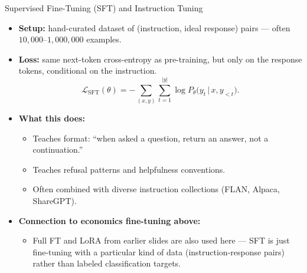 \begin{frame}{Supervised Fine-Tuning (SFT) and Instruction Tuning}
\begin{itemize}
\item \textbf{Setup:} hand-curated dataset of (instruction, ideal response) pairs --- often $10{,}000$--$1{,}000{,}000$ examples.

\medskip
\item \textbf{Loss:} same next-token cross-entropy as pre-training, but only on the response tokens, conditional on the instruction.
\[
   \mathcal{L}_{\text{SFT}}(\theta)
   = -\sum_{(x,y)} \sum_{t=1}^{|y|} \log P_\theta\bigl(y_t \,\big|\, x, y_{<t}\bigr).
\]

\medskip
\item \textbf{What this does:}
\begin{itemize}
\item Teaches format: ``when asked a question, return an answer, not a continuation.''
\item Teaches refusal patterns and helpfulness conventions.
\item Often combined with diverse instruction collections (FLAN, Alpaca, ShareGPT).
\end{itemize}

\medskip
\item \textbf{Connection to economics fine-tuning above:}
\begin{itemize}
\item Full FT and LoRA from earlier slides are also used here --- SFT is just fine-tuning with a particular kind of data (instruction-response pairs) rather than labeled classification targets.
\end{itemize}
\end{itemize}
\end{frame}

